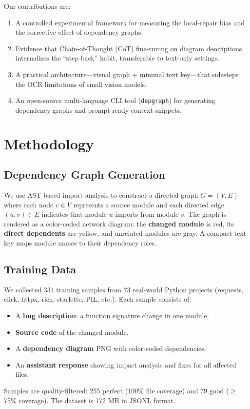 \documentclass[11pt,a4paper]{article}
\begin{document}
Our contributions are:
\begin{enumerate}[nosep]
\item A controlled experimental framework for measuring the local-repair bias and the corrective effect of dependency graphs.
\item Evidence that Chain-of-Thought (CoT) fine-tuning on diagram descriptions internalizes the ``step back'' habit, transferable to text-only settings.
\item A practical architecture---visual graph + minimal text key---that sidesteps the OCR limitations of small vision models.
\item An open-source multi-language CLI tool (\texttt{depgraph}) for generating dependency graphs and prompt-ready context snippets.
\end{enumerate}

\section{Methodology}

\subsection{Dependency Graph Generation}
We use AST-based import analysis to construct a directed graph $G=(V,E)$ where each node $v \in V$ represents a source module and each directed edge $(u,v) \in E$ indicates that module $u$ imports from module $v$. The graph is rendered as a color-coded network diagram: the \textbf{changed module} is red, its \textbf{direct dependents} are yellow, and unrelated modules are gray. A compact text key maps module names to their dependency roles.

\subsection{Training Data}
We collected 334 training samples from 73 real-world Python projects (requests, click, httpx, rich, starlette, PIL, etc.). Each sample consists of:
\begin{itemize}[nosep]
\item A \textbf{bug description}: a function signature change in one module.
\item \textbf{Source code} of the changed module.
\item A \textbf{dependency diagram} PNG with color-coded dependencies.
\item An \textbf{assistant response} showing impact analysis and fixes for all affected files.
\end{itemize}
Samples are quality-filtered: 255 perfect (100\% file coverage) and 79 good ($\geq$75\% coverage). The dataset is 172 MB in JSONL format.
\end{document}
